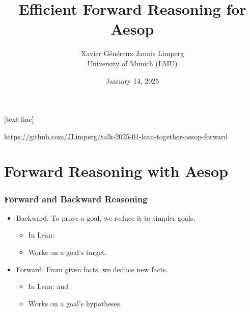 \title{Efficient Forward Reasoning for Aesop}
\author{Xavier Généreux \qquad Jannis Limperg\\ University of Munich (LMU)}
\date{January 14, 2025}

[text line]{\parbox{\textwidth}{\centering \url{https://github.com/JLimperg/talk-2025-01-lean-together-aesop-forward}\medskip}}

\begin{frame}
  \maketitle
\end{frame}



\begin{frame}
  \tableofcontents
\end{frame}

\section{Forward Reasoning with Aesop}

\begin{frame}
  \frametitle{Forward and Backward Reasoning}

  \begin{itemize}
    \item Backward:
    To prove a goal, we reduce it to simpler goals.
    \begin{itemize}
      \item In Lean: 
      \item Works on a goal's target.
    \end{itemize}

    \item Forward:
    From given facts, we deduce new facts.
    \begin{itemize}
      \item In Lean:  and 
      \item Works on a goal's hypotheses.
    \end{itemize}
  \end{itemize}
\end{frame}

